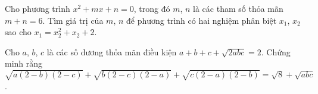 \begin{ex}%
Cho phương trình $x^2+mx+n=0$, trong đó $m$, $n$ là các tham số thỏa mãn $m+n=6$. Tìm giá trị của $m$, $n$ để phương trình có hai nghiệm phân biệt $x_1$, $x_2$ sao cho $x_1=x^2_2+x_2+2$.
\end{ex}

\begin{ex}%
Cho $a$, $b$, $c$ là các số dương thỏa mãn điều kiện $a+b+c+\sqrt{2abc}=2$. Chứng minh rằng $\sqrt{a(2-b)(2-c)}+\sqrt{b(2-c)(2-a)}+\sqrt{c(2-a)(2-b)}=\sqrt{8}+\sqrt{abc}$.
\end{ex}

